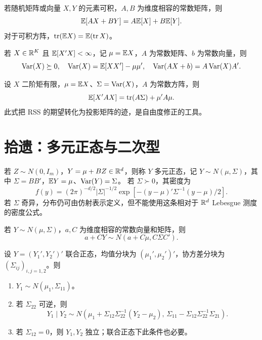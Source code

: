 \begin{theorem}[期望的线性性质]\label{reg:entry:66}
若随机矩阵或向量 $X,Y$ 的元素可积，$A,B$ 为维度相容的常数矩阵，则
\[\mathbb{E}[AX+BY]=A\mathbb{E}[X]+B\mathbb{E}[Y].\]
对于可积方阵，$\operatorname{tr}(\mathbb{E} X)=\mathbb{E}(\operatorname{tr} X)$。
\end{theorem}

\begin{theorem}[协方差矩阵的性质]\label{reg:entry:67}
若 $X\in\mathbb{R}^K$ 且 $\mathbb{E}[X'X]<\infty$，记 $\mu=\mathbb{E} X$，$A$ 为常数矩阵、$b$ 为常数向量，则
\[\operatorname{Var}(X)\succeq0,\quad \operatorname{Var}(X)=\mathbb{E}[XX']-\mu\mu',\quad \operatorname{Var}(AX+b)=A\operatorname{Var}(X)A'.\]
\end{theorem}

\begin{proposition}[二次型期望的必要公式]\label{reg:entry:68}
设 $X$ 二阶矩有限，$\mu=\mathbb{E} X$、$\Sigma=\operatorname{Var}(X)$，$A$ 为常数方阵，则
\[\mathbb{E}[X'AX]=\operatorname{tr}(A\Sigma)+\mu'A\mu.\]
此式把 RSS 的期望转化为投影矩阵的迹，是自由度修正的工具。
\end{proposition}

\section{拾遗：多元正态与二次型}

\begin{definition}[多元正态分布]\label{reg:entry:69}
若 $Z\sim N(0,I_m)$，$Y=\mu+BZ\in\mathbb{R}^d$，则称 $Y$ 多元正态，记 $Y\sim N(\mu,\Sigma)$，其中 $\Sigma=BB'$，$\mathbb{E} Y=\mu$、$\operatorname{Var}(Y)=\Sigma$。
若 $\Sigma\succ0$，其密度为
\[f(y)=(2\pi)^{-d/2}|\Sigma|^{-1/2}\exp[-(y-\mu)'\Sigma^{-1}(y-\mu)/2].\]
若 $\Sigma$ 奇异，分布仍可由仿射表示定义，但不能使用这条相对于 $\mathbb{R}^d$ Lebesgue 测度的密度公式。
\end{definition}

\begin{theorem}[正态向量的仿射变换]\label{reg:entry:70}
若 $Y\sim N(\mu,\Sigma)$，$a,C$ 为维度相容的常数向量和矩阵，则
\[a+CY\sim N(a+C\mu,C\Sigma C').\]
\end{theorem}

\begin{theorem}[分块正态分布]\label{reg:entry:71}
设 $Y=(Y_1',Y_2')'$ 联合正态，均值分块为 $(\mu_1',\mu_2')'$，协方差分块为 $(\Sigma_{ij})_{i,j=1,2}$。则
\begin{enumerate}
\item $Y_1\sim N(\mu_1,\Sigma_{11})$。
\item 若 $\Sigma_{22}$ 可逆，则
\[Y_1\mid Y_2\sim N\!\left(\mu_1+\Sigma_{12}\Sigma_{22}^{-1}(Y_2-\mu_2),\,
\Sigma_{11}-\Sigma_{12}\Sigma_{22}^{-1}\Sigma_{21}\right).\]
\item 若 $\Sigma_{12}=0$，则 $Y_1,Y_2$ 独立；联合正态下此条件也必要。
\end{enumerate}
\end{theorem}

